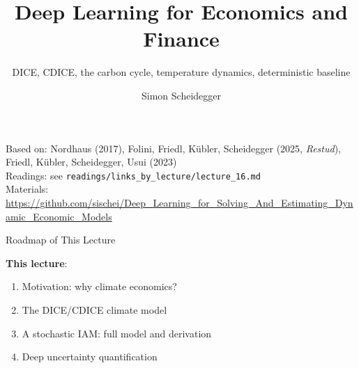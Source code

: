 \documentclass[aspectratio=169,11pt]{beamer}
\title[Deep Learning for Dynamic Economic Models]
{Deep Learning for Economics and Finance}
\subtitle{DICE, CDICE, the carbon cycle, temperature dynamics, deterministic baseline}
\author{Simon Scheidegger}
\institute[HEC Lausanne]{HEC, University of Lausanne}
\date{}
\begin{document}
\newcommand{\exercisepause}{%
  \tikz[baseline=(X.base)]{\node[fill=darkgreen!80!black, text=white,
  rounded corners=2pt, inner sep=3pt, font=\scriptsize\bfseries](X){PAUSE --- 5 min};}}



{
\begin{frame}
\titlepage
\vspace{-0.4cm}
\begin{center}
{\footnotesize Based on: Nordhaus (2017), Folini, Friedl, K\"ubler, Scheidegger (2025, \textit{Restud}),}\\[1pt]
{\footnotesize Friedl, K\"ubler, Scheidegger, Usui (2023)}\\[4pt]
{\footnotesize Readings: see \texttt{readings/links\_by\_lecture/lecture\_16.md}}\\[4pt]
{\footnotesize Materials: \url{https://github.com/sischei/Deep_Learning_for_Solving_And_Estimating_Dynamic_Economic_Models}}
\end{center}
\end{frame}
}

\begin{frame}{Roadmap of This Lecture}
\begin{center}
\end{center}

\vspace{0.3cm}
\textbf{This lecture}:
\begin{enumerate}
    \item Motivation: why climate economics?
    \item The DICE/CDICE climate model
    \item A stochastic IAM: full model and derivation
    \item Deep uncertainty quantification
\end{enumerate}
\end{frame}
\end{document}
